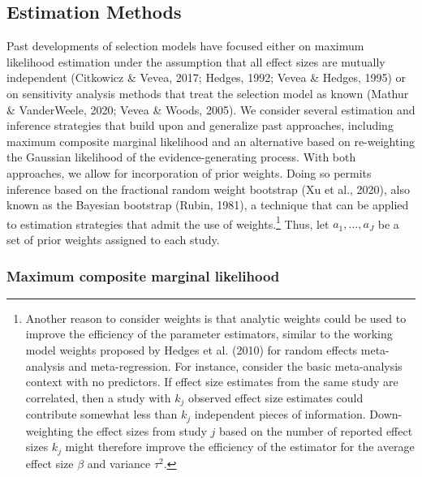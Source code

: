 \documentclass[
  man, donotrepeattitle,floatsintext]{apa7}
\begin{document}
\subsection{Estimation Methods}\label{estimation-methods}

Past developments of selection models have focused either on maximum likelihood estimation under the assumption that all effect sizes are mutually independent (Citkowicz \& Vevea, 2017; Hedges, 1992; Vevea \& Hedges, 1995) or on sensitivity analysis methods that treat the selection model as known (Mathur \& VanderWeele, 2020; Vevea \& Woods, 2005). We consider several estimation and inference strategies that build upon and generalize past approaches, including maximum composite marginal likelihood and an alternative based on re-weighting the Gaussian likelihood of the evidence-generating process.
With both approaches, we allow for incorporation of prior weights.
Doing so permits inference based on the fractional random weight bootstrap (Xu et al., 2020), also known as the Bayesian bootstrap (Rubin, 1981), a technique that can be applied to estimation strategies that admit the use of weights.\footnote{Another reason to consider weights is that analytic weights could be used to improve the efficiency of the parameter estimators, similar to the working model weights proposed by Hedges et al. (2010) for random effects meta-analysis and meta-regression. For instance, consider the basic meta-analysis context with no predictors. If effect size estimates from the same study are correlated, then a study with \(k_j\) observed effect size estimates could contribute somewhat less than \(k_j\) independent pieces of information. Down-weighting the effect sizes from study \(j\) based on the number of reported effect sizes \(k_j\) might therefore improve the efficiency of the estimator for the average effect size \(\beta\) and variance \(\tau^2\).}
Thus, let \(a_1,...,a_J\) be a set of prior weights assigned to each study.

\subsubsection{Maximum composite marginal likelihood}\label{maximum-composite-marginal-likelihood}
\end{document}
